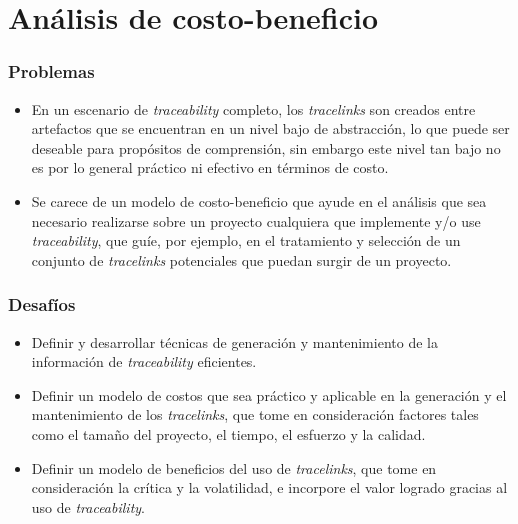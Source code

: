 \documentclass[a4paper,12pt,twoside,spanish,openright]{book}
\begin{document}
\section{Análisis de costo-beneficio}

\subsubsection{Problemas}

\begin{itemize}[label={$\times$}]

\item En un escenario de \textit{traceability} completo, los \textit{tracelinks} son creados entre artefactos que se encuentran en un nivel bajo de abstracción, lo que puede ser deseable para propósitos de comprensión, sin embargo este nivel tan bajo no es por lo general práctico ni efectivo en términos de costo.

\item Se carece de un modelo de costo-beneficio que ayude en el análisis que sea necesario realizarse sobre un proyecto cualquiera que implemente y/o use \textit{traceability}, que guíe, por ejemplo, en el tratamiento y selección de un conjunto de \textit{tracelinks} potenciales que puedan surgir de un proyecto.

\end{itemize}

\subsubsection{Desafíos}

\begin{itemize}[label={\checkmark}]

\item Definir y desarrollar técnicas de generación y mantenimiento de la información de \textit{traceability} eficientes.

\item Definir un modelo de costos que sea práctico y aplicable en la generación y el mantenimiento de los \textit{tracelinks}, que tome en consideración factores tales como el tamaño del proyecto, el tiempo, el esfuerzo y la calidad.

\item Definir un modelo de beneficios del uso de \textit{tracelinks}, que tome en consideración la crítica y la volatilidad, e incorpore el valor logrado gracias al uso de \textit{traceability}.

\end{itemize}
\end{document}
